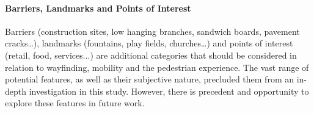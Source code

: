 \paragraph{Barriers, Landmarks and Points of Interest}
Barriers (construction sites, low hanging branches, sandwich boards, pavement cracks…), landmarks (fountains, play fields, churches…) and points of interest (retail, food, services...) are additional categories that should be considered in relation to wayfinding, mobility and the pedestrian experience.  The vast range of potential features, as well as their subjective nature, precluded them from an in-depth investigation in this study.  However, there is precedent and opportunity to explore these features in future work.   

